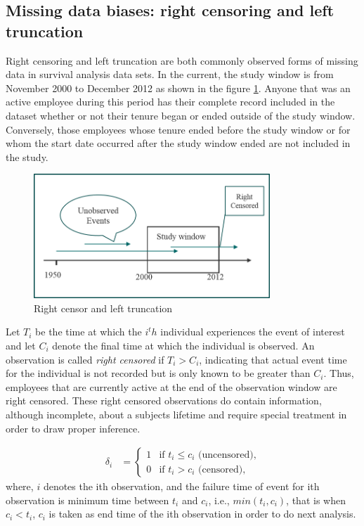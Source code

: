 \documentclass[12pt,letterpaper]{article}
\begin{document}
 \subsection{Missing data biases: right censoring and left truncation}
 Right censoring and left truncation are both commonly observed forms of missing data in survival analysis data sets. In the current, the study window is from November 2000 to December 2012 as shown in the figure \ref{fig:1}.  Anyone that was an active employee during this period has their complete record included in the dataset whether or not their tenure began or ended outside of the study window.  Conversely, those employees whose tenure ended before the study window or for whom the start date occurred after the study window ended are not included in the study.

 \begin{figure}[htbp]
 	\centering
 	\includegraphics[width=3.5in]{fig1.png}
 	\caption{Right censor and left truncation}
 	\label{fig:1}
 \end{figure}
  Let $T_i$ be the time at which the $i^th$ individual experiences the event of interest and let $C_i$ denote the final time at which the individual is observed. An observation is called {\it right censored} if $T_i> C_i$, indicating that actual event time for the individual  is not recorded but is only known to be greater than $C_i$. Thus, employees that are currently active at the end of the observation window are right censored. These right censored observations do contain information, although incomplete, about a subjects lifetime and require special treatment in order to draw proper inference.

 \begin{align*}
 	\delta_i&=
 	\begin{cases}
 		1   &\text{if  }  t_i \leq c_i \text{ (uncensored),}\\
 		0   &\text{if  }  t_i > c_i \text{ (censored),}
 	\end{cases}
 \end{align*}
 where, $i$ denotes the ith observation, and the failure time of event for ith observation is minimum time between $t_i$ and $c_i$, i.e., $min(t_i, c_i)$, that is when $ c_i <t_i $, $c_i$ is taken as end time of the ith observation in order to do next  analysis.
\end{document}
